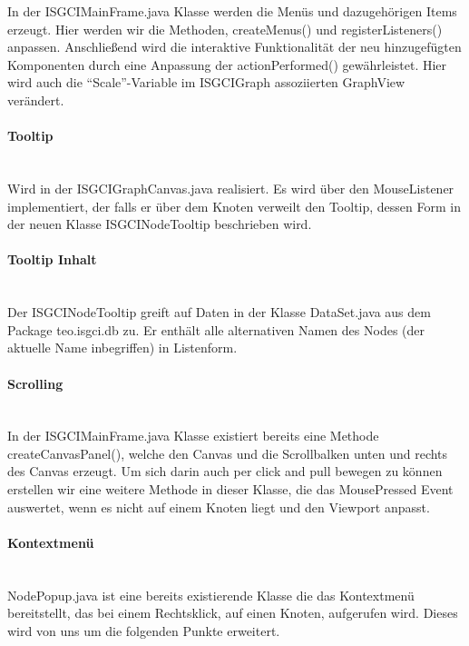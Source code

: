 \documentclass[10pt,a4paper]{article}
\begin{document}
\begin{itemize}
In der ISGCIMainFrame.java Klasse werden die Menüs und dazugehörigen Items erzeugt. Hier werden wir die Methoden, createMenus() und registerListeners() anpassen. Anschließend wird die interaktive Funktionalität der neu hinzugefügten Komponenten durch eine Anpassung der actionPerformed() gewährleistet. Hier wird auch die "`Scale"'-Variable im ISGCIGraph assoziierten GraphView verändert.

\paragraph{Tooltip}\ \\ 

Wird in der ISGCIGraphCanvas.java realisiert. Es wird über den MouseListener implementiert, der falls er über dem Knoten verweilt den Tooltip, dessen Form in der neuen Klasse ISGCINodeTooltip beschrieben wird.

\paragraph{Tooltip Inhalt}\ \\ 

 Der ISGCINodeTooltip greift auf Daten in der Klasse DataSet.java aus dem Package teo.isgci.db zu. Er enthält alle alternativen Namen des Nodes (der aktuelle Name inbegriffen) in Listenform.


\paragraph{Scrolling}\ \\ 

In der ISGCIMainFrame.java Klasse existiert bereits eine Methode createCanvasPanel(), welche den Canvas und die Scrollbalken unten und rechts des Canvas erzeugt. Um sich darin auch per click and pull bewegen zu können erstellen wir eine weitere Methode in dieser Klasse, die das MousePressed Event auswertet, wenn es nicht auf einem Knoten liegt und den Viewport anpasst.

\paragraph{Kontextmenü}\ \\ 

NodePopup.java ist eine bereits existierende Klasse die das Kontextmenü bereitstellt, das bei einem Rechtsklick, auf einen Knoten, aufgerufen wird. Dieses wird von uns um die folgenden Punkte erweitert. 


\end{itemize}
\end{document}
